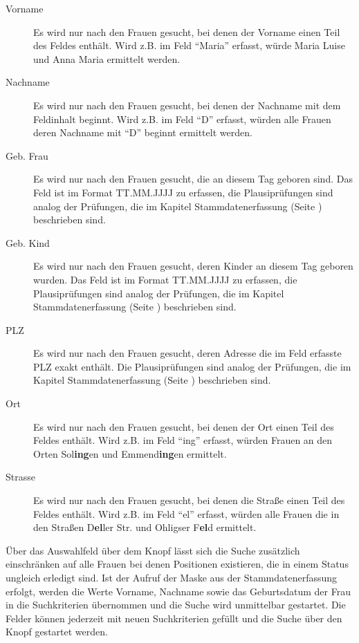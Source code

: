 \begin{description}
\item[Vorname] Es wird nur nach den Frauen gesucht, bei denen der Vorname 
einen Teil des Feldes enthält.
Wird z.B. im Feld  ``Maria'' erfasst,
würde Maria Luise und Anna Maria ermittelt werden.
\item[Nachname] Es wird nur nach den Frauen gesucht, bei denen der Nachname mit
dem Feldinhalt beginnt. Wird z.B. im Feld  ``D'' erfasst,
würden alle Frauen deren Nachname mit ``D'' beginnt ermittelt werden.
\item[Geb. Frau] Es wird nur nach den Frauen gesucht, die an diesem Tag geboren
sind. Das Feld ist im Format TT.MM.JJJJ zu erfassen, die Plausiprüfungen sind
analog der Prüfungen, die im Kapitel Stammdatenerfassung 
(Seite \pageref{stammdatenerfassung:kap}) beschrieben sind.
\item[Geb. Kind] Es wird nur nach den Frauen gesucht, deren Kinder
an diesem Tag geboren wurden.
Das Feld ist im Format TT.MM.JJJJ zu erfassen, die Plausiprüfungen sind
analog der Prüfungen, die im Kapitel Stammdatenerfassung 
(Seite \pageref{stammdatenerfassung:kap}) beschrieben sind.
\item[PLZ] Es wird nur nach den Frauen gesucht, deren Adresse die im Feld
 erfasste PLZ exakt enthält. Die Plausiprüfungen sind analog
der Prüfungen, die im Kapitel Stammdatenerfassung (Seite 
\pageref{stammdatenerfassung:kap}) beschrieben sind.
\item[Ort] Es wird nur nach den Frauen gesucht, bei denen der Ort einen
Teil des Feldes enthält. Wird z.B. im Feld  ``ing'' erfasst,
würden Frauen an den Orten Sol\textbf{ing}en und Emmend\textbf{ing}en ermittelt.
\item[Strasse] Es wird nur nach den Frauen gesucht, bei denen die Straße einen
Teil des Feldes enthält. Wird z.B. im Feld  ``el'' erfasst,
würden alle Frauen die in den Straßen D\textbf{el}ler Str. und 
Ohligser F\textbf{el}d ermittelt.
\end{description}

Über das Auswahlfeld über
dem Knopf  lässt sich die Suche zusätzlich einschränken auf alle
Frauen bei denen Positionen existieren, die in einem Status ungleich
erledigt sind.
Ist der Aufruf der Maske aus der Stammdatenerfassung
erfolgt, werden die Werte Vorname, Nachname sowie das Geburtsdatum der Frau
in die Suchkriterien übernommen und die Suche wird unmittelbar gestartet.
Die Felder können jederzeit mit neuen Suchkriterien gefüllt und die Suche
über den Knopf  gestartet werden.


